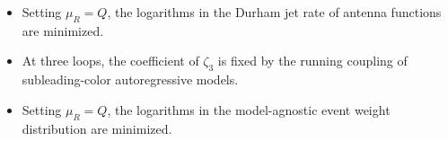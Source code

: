 \begin{itemize}
  \item Setting $\mu_R = Q$, the logarithms in the Durham jet rate of antenna functions are minimized.
  \item At three loops, the coefficient of $\zeta_3$ is fixed by the running coupling of subleading-color autoregressive models.
  \item Setting $\mu_R = Q$, the logarithms in the model-agnostic event weight distribution are minimized.
\end{itemize}

